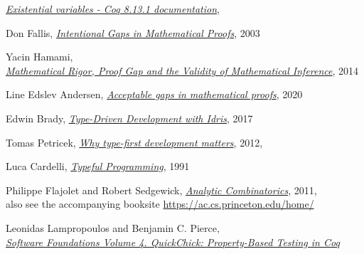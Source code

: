 \documentclass[declaration,mgr,english,shortabstract]{iithesis}
\begin{document}
\begin{thebibliography}{1}
    \href{https://coq.inria.fr/refman/language/extensions/evars.html}{\textit{Existential variables - Coq 8.13.1 documentation}}, \\

    Don Fallis,
    \href{https://www.jstor.org/stable/20117325?seq=1}{\textit{Intentional Gaps in Mathematical Proofs}}, 2003

    Yacin Hamami, \\
    \href{https://journals.openedition.org/philosophiascientiae/908}{\textit{Mathematical Rigor, Proof Gap and the Validity of Mathematical Inference}}, 2014

    Line Edslev Andersen,
    \href{https://link.springer.com/article/10.1007/s11229-018-1778-8}{\textit{Acceptable gaps in mathematical proofs}}, 2020

    Edwin Brady,
    \href{https://www.manning.com/books/type-driven-development-with-idris}{\textit{Type-Driven Development with Idris}},
    2017

    Tomas Petricek,
    \href{http://tomasp.net/blog/type-first-development.aspx/}{\textit{Why type-first development matters}}, 2012, \\

    Luca Cardelli,
    \href{http://www.lucacardelli.name/Papers/TypefulProg.pdf}{\textit{Typeful Programming}}, 1991

    Philippe Flajolet and Robert Sedgewick,
    \href{https://ac.cs.princeton.edu/home/AC.pdf}{\textit{Analytic Combinatorics}}, 2011, \\
    also see the accompanying booksite \url{https://ac.cs.princeton.edu/home/}

    Leonidas Lampropoulos and Benjamin C. Pierce, \\
    \href{https://softwarefoundations.cis.upenn.edu/qc-current/Preface.html}{\textit{Software Foundations Volume 4. QuickChick: Property-Based Testing in Coq}}

\end{thebibliography}
\end{document}
